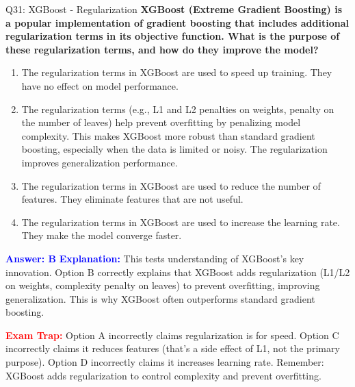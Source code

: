 \documentclass[8pt]{beamer}
\begin{document}
	\begin{frame}{Q31: XGBoost - Regularization}
		\fontsize{6.5}{7.5}\selectfont
		\textbf{XGBoost (Extreme Gradient Boosting) is a popular implementation of gradient boosting that includes additional regularization terms in its objective function. What is the purpose of these regularization terms, and how do they improve the model?}
		
		\begin{enumerate}
			\item The regularization terms in XGBoost are used to speed up training. They have no effect on model performance.
			\item The regularization terms (e.g., L1 and L2 penalties on weights, penalty on the number of leaves) help prevent overfitting by penalizing model complexity. This makes XGBoost more robust than standard gradient boosting, especially when the data is limited or noisy. The regularization improves generalization performance.
			\item The regularization terms in XGBoost are used to reduce the number of features. They eliminate features that are not useful.
			\item The regularization terms in XGBoost are used to increase the learning rate. They make the model converge faster.
		\end{enumerate}
		
		\vspace{0.1cm}
		\textcolor{blue}{\textbf{Answer: B}}
		\vspace{0.1cm}
		\textcolor{blue}{\textbf{Explanation:}} This tests understanding of XGBoost's key innovation. Option B correctly explains that XGBoost adds regularization (L1/L2 on weights, complexity penalty on leaves) to prevent overfitting, improving generalization. This is why XGBoost often outperforms standard gradient boosting.
		
		\textcolor{red}{\textbf{Exam Trap:}} Option A incorrectly claims regularization is for speed. Option C incorrectly claims it reduces features (that's a side effect of L1, not the primary purpose). Option D incorrectly claims it increases learning rate. Remember: XGBoost adds regularization to control complexity and prevent overfitting.
	\end{frame}
	
\end{document}
